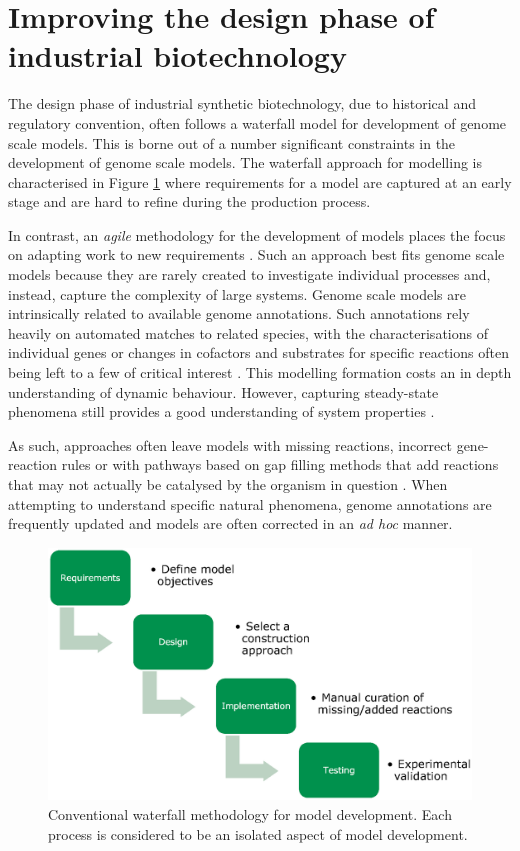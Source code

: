 \documentclass[journal=asbcd6]{achemso}
\begin{document}
\section{Improving the design phase of industrial biotechnology}

The design phase of industrial synthetic biotechnology, due to historical and regulatory convention, often follows a waterfall model for development of genome scale models.
This is borne out of a number significant constraints in the development of genome scale models.
The waterfall approach for modelling is characterised in Figure \ref{fig:methodology_approaches} where requirements for a model are captured at an early stage and are hard to refine during the production process.

In contrast, an \textit{agile} methodology for the development of models places the focus on adapting work to new requirements \cite{martin2002agile}.
Such an approach best fits genome scale models because they are rarely created to investigate individual processes and, instead, capture the complexity of large systems.
Genome scale models are intrinsically related to available genome annotations.
Such annotations rely heavily on automated matches to related species, with the characterisations of individual genes or changes in cofactors and substrates for specific reactions often being left to a few of critical interest \cite{seemann2014prokka}.
This modelling formation costs an in depth understanding of dynamic behaviour. 
However, capturing steady-state phenomena still provides a good understanding of system properties \cite{o2015using}.

As such, approaches often leave models with missing reactions, incorrect gene-reaction rules \cite{thiele2010protocol} or with pathways based on gap filling methods that add reactions that may not actually be catalysed by the organism in question \cite{benedict2014likelihood}.
When attempting to understand specific natural phenomena, genome annotations are frequently updated and models are often corrected in an \textit{ad hoc} manner.

\begin{figure}[ht]
\includegraphics[width=\textwidth]{waterfall.eps}
\caption{Conventional waterfall methodology for model development.
Each process is considered to be an isolated aspect of model development.}
\label{fig:methodology_approaches}
\end{figure}
\end{document}
